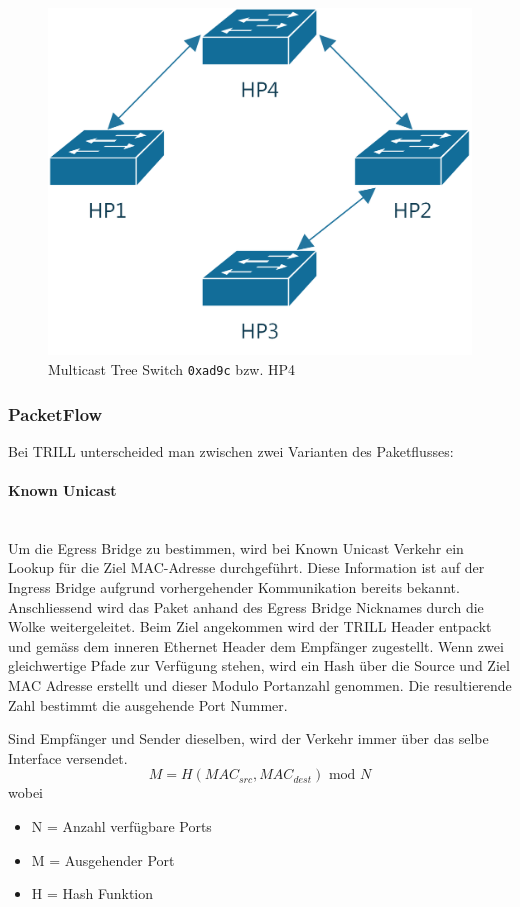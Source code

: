 \begin{figure}[H]
	\centering
	\includegraphics[width=0.5\linewidth]{images/multicast_trees/0xad9c}
	\caption{Multicast Tree Switch \lstinline|0xad9c| bzw. HP4}
	\label{fig:multicasttree0xad9c}
\end{figure}

\subsubsection{PacketFlow}
Bei TRILL unterscheided man zwischen zwei Varianten des Paketflusses:

\paragraph{Known Unicast} \hfill \\
Um die Egress Bridge zu bestimmen, wird bei Known Unicast Verkehr ein Lookup für die Ziel MAC-Adresse durchgeführt. Diese Information ist auf der Ingress Bridge aufgrund vorhergehender Kommunikation bereits bekannt. Anschliessend wird das Paket anhand des Egress Bridge Nicknames durch die Wolke weitergeleitet. Beim Ziel angekommen wird der TRILL Header entpackt und gemäss dem inneren Ethernet Header dem Empfänger zugestellt. Wenn zwei gleichwertige Pfade zur Verfügung stehen, wird ein Hash über die Source und Ziel MAC Adresse erstellt und dieser Modulo Portanzahl genommen. Die resultierende Zahl bestimmt die ausgehende Port Nummer.

Sind Empfänger und Sender dieselben, wird der Verkehr immer über das selbe Interface versendet.
\[
	M = H(MAC_{src}, MAC_{dest}) \text{ mod } N
\]
wobei 
\begin{itemize}[label={}]
	\item N = Anzahl verfügbare Ports
	\item M = Ausgehender Port
	\item H = Hash Funktion
\end{itemize}

